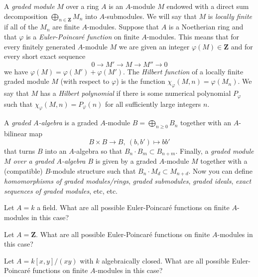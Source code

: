 \begin{definition}
\label{definition-graded-module}
A {\it graded module} $M$ over a ring $A$ is an $A$-module $M$
endowed with a direct sum decomposition
$
\bigoplus\nolimits_{n \in {\mathbf Z}} M_n
$
into $A$-submodules. We will say that $M$ is {\it locally finite} if all of
the $M_n$ are finite $A$-modules. Suppose that $A$ is a Noetherian ring and
that $\varphi$ is a {\it Euler-Poincar\'e function} on finite $A$-modules.
This means that for every finitely generated $A$-module $M$ we are given an
integer $\varphi(M) \in {\mathbf Z}$ and for every short exact sequence
$$
0
\longrightarrow
M'
\longrightarrow
M
\longrightarrow
M''
\longrightarrow
0
$$
we have $\varphi(M) = \varphi(M') + \varphi(M')$. The {\it Hilbert function}
of a locally finite graded module $M$ (with respect to $\varphi$) is the
function $\chi_\varphi(M, n) = \varphi(M_n)$. We say that $M$ has a
{\it Hilbert polynomial} if there is some numerical polynomial
$P_\varphi$ such that $\chi_\varphi(M, n) = P_\varphi(n)$ for all sufficiently
large integers $n$.
\end{definition}

\begin{definition}
\label{definition-graded-algebra}
A {\it graded $A$-algebra} is a graded $A$-module
$B = \bigoplus_{n \geq 0} B_n$ together with an $A$-bilinear map
$$
B \times B \longrightarrow B, \ (b, b') \longmapsto bb'
$$
that turns $B$ into an $A$-algebra so that $B_n \cdot B_m \subset B_{n + m}$.
Finally, a {\it graded module $M$ over a graded $A$-algebra $B$} is given
by a graded $A$-module $M$ together with a (compatible) $B$-module structure
such that $B_n \cdot M_d \subset M_{n + d}$. Now you can define
{\it homomorphisms of graded modules/rings}, {\it graded submodules},
{\it graded ideals}, {\it exact sequences of graded modules}, etc, etc.
\end{definition}

\begin{exercise}
\label{exercise-Euler-Poincare-field}
Let $A = k$ a field. What are all possible Euler-Poincar\'e functions
on finite $A$-modules in this case?
\end{exercise}

\begin{exercise}
\label{exercise-Euler-Poincare-Z}
Let $A ={\mathbf Z}$. What are all possible Euler-Poincar\'e functions
on finite $A$-modules in this case?
\end{exercise}

\begin{exercise}
\label{exercise-Euler-Poincare-node}
Let $A = k[x, y]/(xy)$ with $k$ algebraically closed. What are all
possible Euler-Poincar\'e functions on finite $A$-modules in this case?
\end{exercise}

